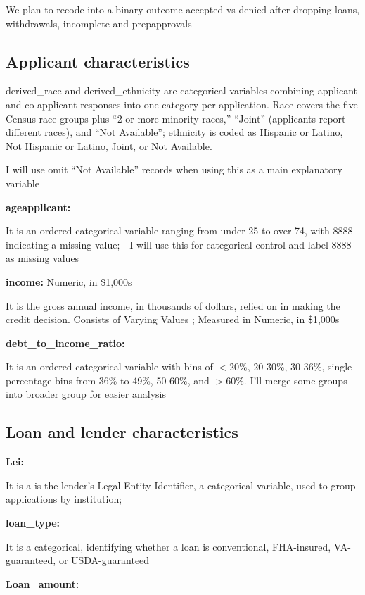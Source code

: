 \documentclass[manuscript,authorversion,nonacm]{acmart}
\begin{document}
We plan to recode into a binary outcome accepted vs denied after dropping loans, withdrawals, incomplete and prepapprovals

\subsection{Applicant characteristics}

derived\_race and derived\_ethnicity are categorical variables combining applicant and co-applicant responses into one category per application. Race covers the five Census race groups plus ``2 or more minority races,'' ``Joint'' (applicants report different races), and ``Not Available''; ethnicity is coded as Hispanic or Latino, Not Hispanic or Latino, Joint, or Not Available.

I will use omit ``Not Available'' records when using this as a main explanatory variable

\noindent\textbf{ageapplicant:}

It is an ordered categorical variable ranging from under 25 to over 74, with 8888 indicating a missing value; - I will use this for categorical control and label 8888 as missing values

\noindent\textbf{income:} Numeric, in \$1,000s

It is the gross annual income, in thousands of dollars, relied on in making the credit decision. Consists of Varying Values ; Measured in Numeric, in \$1,000s

\noindent\textbf{debt\_to\_income\_ratio:}

It is an ordered categorical variable with bins of $<$20\%, 20-30\%, 30-36\%, single-percentage bins from 36\% to 49\%, 50-60\%, and $>$60\%. I’ll merge some groups into broader group for easier analysis

\subsection{Loan and lender characteristics}

\noindent\textbf{Lei:}

It is a is the lender's Legal Entity Identifier, a categorical variable, used to group applications by institution;

\noindent\textbf{loan\_type:}

It is a categorical, identifying whether a loan is conventional, FHA-insured, VA-guaranteed, or USDA-guaranteed

\noindent\textbf{Loan\_amount:}
\end{document}
